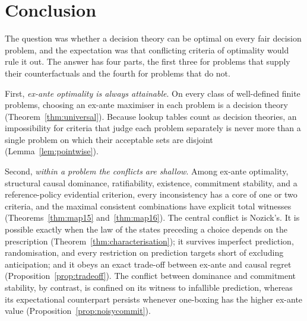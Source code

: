 \section{Conclusion}\label{sec:conclusion}

The question was whether a decision theory can be optimal on every fair decision problem, and the
expectation was that conflicting criteria of optimality would rule it out. The answer has four
parts, the first three for problems that supply their counterfactuals and the fourth for problems
that do not.

First, \emph{ex-ante optimality is always attainable}. On every class of well-defined finite
problems, choosing an ex-ante maximiser in each problem is a decision theory
(Theorem~\ref{thm:universal}). Because lookup tables count as decision theories, an impossibility
for criteria that judge each problem separately is never more than a single problem on which their
acceptable sets are disjoint (Lemma~\ref{lem:pointwise}).

Second, \emph{within a problem the conflicts are shallow}. Among ex-ante optimality, structural
causal dominance, ratifiability, existence, commitment stability, and a reference-policy evidential
criterion, every inconsistency has a core of one or two criteria, and the maximal consistent
combinations have explicit total witnesses (Theorems~\ref{thm:map15} and~\ref{thm:map16}). The
central conflict is Nozick's. It is possible exactly when the law of the states preceding a choice
depends on the prescription (Theorem~\ref{thm:characterisation}); it survives imperfect prediction,
randomisation, and every restriction on prediction targets short of excluding anticipation; and it
obeys an exact trade-off between ex-ante and causal regret (Proposition~\ref{prop:tradeoff}). The
conflict between dominance and commitment stability, by contrast, is confined on its witness to
infallible prediction, whereas its expectational counterpart persists whenever one-boxing has the
higher ex-ante value (Proposition~\ref{prop:noisycommit}).

